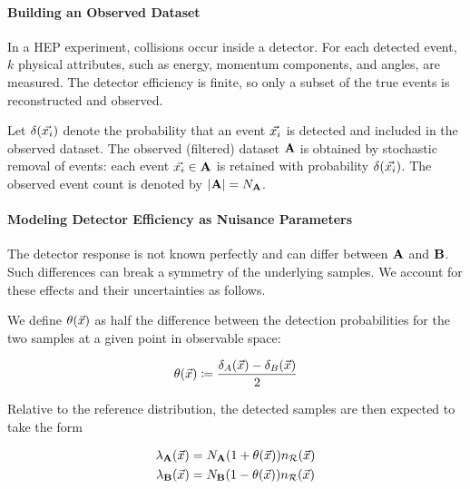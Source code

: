 \documentclass[paper/ddppaper2.tex]{subfiles}
\begin{document}
\paragraph{Building an Observed Dataset}
\label{sec:building_an_observed_dataset}

In a HEP experiment, collisions occur inside a detector. For each detected event, $k$ physical attributes, such as energy, momentum components, and angles, are measured. The detector efficiency is finite, so only a subset of the true events is reconstructed and observed.

Let $\delta({\vec{{x}_i}})$ denote the probability that an event ${\vec{{x}_i}}$ is detected and included in the observed dataset. The observed (filtered) dataset ${\mathbf{A}}$ is obtained by stochastic removal of events: each event ${\vec{{x}_i}} \in {\mathbf{A}}$ is retained with probability $\delta({\vec{{x}_i}})$. The observed event count is denoted by $|{\mathbf{A}}| = N_{\mathbf{A}}$.

\paragraph{Modeling Detector Efficiency as Nuisance Parameters}

The detector response is not known perfectly and can differ between ${\mathbf{A}}$ and ${\mathbf{B}}$. Such differences can break a symmetry of the underlying samples. We account for these effects and their uncertainties as follows.

We define ${\theta}(\vec{{x}})$ as half the difference between the detection probabilities for the two samples at a given point in observable space:

\begin{equation}
\label{eq:nuisance_from_detector_efficiencies}
    \nparam(\anyevent) \coloneqq \frac{\detector_{A}(\anyevent) - \detector_{B}(\anyevent)}{2}   
\end{equation}

Relative to the reference distribution, the detected samples are then expected to take the form

\begin{equation}
\begin{aligned}
    {{\lambda}_{{\mathbf{A}}}(\vec{{x}})} &= N_{{\mathbf{A}}}(1 + {\theta}(\vec{{x}}))n_{\mathcal{R}}({\vec{{x}}}) \\
    {{\lambda}_{{\mathbf{B}}}(\vec{{x}})} &= N_{{\mathbf{B}}}(1 - {\theta}(\vec{{x}}))n_{\mathcal{R}}({\vec{{x}}})
\end{aligned}
\end{equation}
\end{document}
